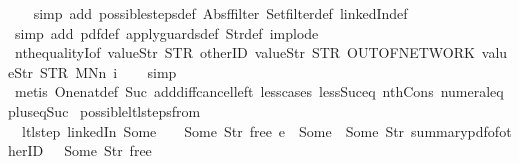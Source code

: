 \begin{isabellebody}
%
\isadelimproof
\ \ %
\endisadelimproof
%
\isatagproof
{}\isamarkupfalse%
\ {\isacharparenleft}simp\ add{\isacharcolon}\ possible{\isacharunderscore}steps{\isacharunderscore}def\ Abs{\isacharunderscore}ffilter\ Set{\isachardot}filter{\isacharunderscore}def\ linkedIn{\isacharunderscore}def{\isacharparenright}\isanewline
\ \ \isamarkupfalse%
\ {\isacharparenleft}simp\ add{\isacharcolon}\ pdf{}{\isacharunderscore}def\ apply{\isacharunderscore}guards{\isacharunderscore}def\ Str{\isacharunderscore}def\ implode{\isacharparenright}\isanewline
\ \ \isamarkupfalse%
\ nth{\isacharunderscore}equalityI{\isacharbrackleft}of\ {\isachardoublequoteopen}{\isacharbrackleft}value{\isachardot}Str\ STR\ {\isacharprime}{\isacharprime}otherID{\isacharprime}{\isacharprime}{\isacharcomma}\ value{\isachardot}Str\ STR\ {\isacharprime}{\isacharprime}OUT{\isacharunderscore}OF{\isacharunderscore}NETWORK{\isacharprime}{\isacharprime}{\isacharcomma}\ value{\isachardot}Str\ STR\ {\isacharprime}{\isacharprime}MNn{}{\isacharprime}{\isacharprime}{\isacharbrackright}{\isachardoublequoteclose}\ i{\isacharbrackright}\isanewline
\ \ \isamarkupfalse%
\ simp\isanewline
\ \ \isamarkupfalse%
\ {\isacharparenleft}metis\ One{\isacharunderscore}nat{\isacharunderscore}def\ Suc{\isacharunderscore}{}\ add{\isacharunderscore}diff{\isacharunderscore}cancel{\isacharunderscore}left{\isacharprime}\ less{\isacharunderscore}{}{\isacharunderscore}cases\ less{\isacharunderscore}Suc{\isacharunderscore}eq\ nth{\isacharunderscore}Cons{\isacharprime}\ numeral{\isacharunderscore}{}{\isacharunderscore}eq{\isacharunderscore}{}\ plus{\isacharunderscore}{}{\isacharunderscore}eq{\isacharunderscore}Suc{\isacharparenright}%
\endisatagproof
{\isafoldproof}%
%
\isadelimproof
\isanewline
%
\endisadelimproof
\isanewline
{}\isamarkupfalse%
\ possible{\isacharunderscore}ltl{\isacharunderscore}steps{\isacharunderscore}from{\isacharunderscore}{}{\isacharcolon}\isanewline
\ \ {\isachardoublequoteopen}ltl{\isacharunderscore}step\ linkedIn\ {\isacharparenleft}Some\ {}{\isacharparenright}\ {\isacharparenleft}{\isacharless}{\isachargreater}{\isacharparenleft}{}\ {\isachardollar}{\isacharcolon}{\isacharequal}\ Some\ {\isacharparenleft}Str\ {\isacharprime}{\isacharprime}free{\isacharprime}{\isacharprime}{\isacharparenright}{\isacharparenright}{\isacharparenright}\ e\ {\isacharequal}\ {\isacharparenleft}Some\ {}{\isacharcomma}\ {\isacharbrackleft}Some\ {\isacharparenleft}Str\ {\isacharprime}{\isacharprime}summary{\isacharunderscore}pdf{\isacharunderscore}of{\isacharunderscore}otherID{\isacharprime}{\isacharprime}{\isacharparenright}{\isacharbrackright}{\isacharcomma}\ {\isacharparenleft}{\isacharless}{\isachargreater}{\isacharparenleft}{}\ {\isachardollar}{\isacharcolon}{\isacharequal}\ Some\ {\isacharparenleft}Str\ {\isacharprime}{\isacharprime}free{\isacharprime}{\isacharprime}{\isacharparenright}{\isacharparenright}{\isacharparenright}{\isacharparenright}\ {\isasymor}\isanewline

\end{isabellebody}
